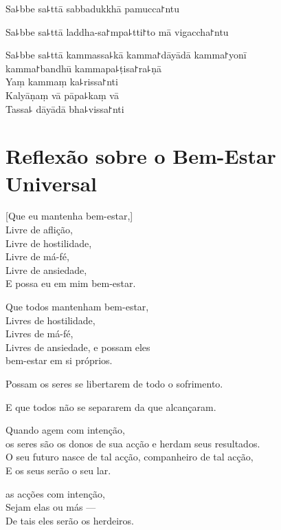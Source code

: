 \documentclass[
  babelLanguage=english,
  final,
  webversion,
]{chantingbook}
\begin{document}
Sa꜕bbe sa꜕ttā sabbadukkhā pamucca꜓ntu

Sa꜕bbe sa꜕ttā laddha-sa꜓mpa꜕tti꜓to mā vigaccha꜓ntu

Sa꜕bbe sa꜕ttā kammassa꜕kā kamma꜓dāyādā kamma꜓yonī\\
\vin kamma꜓bandhū kammapa꜕ṭisa꜓ra꜕ṇā\\
Yaṃ kammaṃ ka꜕rissa꜓nti\\
Kalyāṇaṃ vā pāpa꜕kaṃ vā\\
Tassa꜕ dāyādā bha꜕vissa꜓nti

\chapter[Bem-Estar Universal]{Reflexão sobre o Bem-Estar Universal}


\begin{leader}
\end{leader}

[Que eu mantenha bem-estar,]\\
Livre de aflição,\\
Livre de hostilidade,\\
Livre de má-fé,\\
Livre de ansiedade,\\
E possa eu  em mim bem-estar.

Que todos mantenham bem-estar,\\
Livres de hostilidade,\\
Livres de má-fé,\\
Livres de ansiedade, e possam eles\\
 bem-estar em si próprios.

Possam  os seres se libertarem de todo o sofrimento.

E que todos não se separarem da  que alcançaram.

Quando agem com intenção,\\
 os seres são os donos de sua acção e herdam seus resultados.\\
O seu futuro nasce de tal acção, companheiro de tal acção,\\
E os seus  serão o seu lar.

 as acções com intenção,\\
Sejam elas  ou más ---\\
De tais  eles serão os herdeiros.
\end{document}
